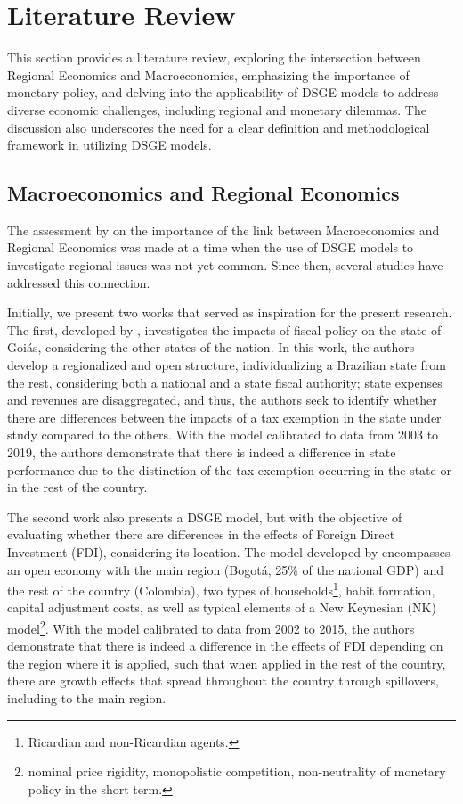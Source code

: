 \documentclass[../thesis.tex]{subfiles}
\begin{document}
\newpage

\section{Literature Review}\label{sec:literature-review}

This section provides a literature review, exploring the intersection between Regional Economics and Macroeconomics, emphasizing the importance of monetary policy, and delving into the applicability of DSGE models to address diverse economic challenges, including regional and monetary dilemmas. The discussion also underscores the need for a clear definition and methodological framework in utilizing DSGE models.

\subsection*{Macroeconomics and Regional Economics}

The assessment by \textcite{rickman_modern_2010} on the importance of the link between Macroeconomics and Regional Economics was made at a time when the use of DSGE models to investigate regional issues was not yet common. Since then, several studies have addressed this connection.

Initially, we present two works that served as inspiration for the present research. The first, developed by \textcite{costa_junior_dsge_2022}, investigates the impacts of fiscal policy on the state of Goiás, considering the other states of the nation. In this work, the authors develop a regionalized and open structure, individualizing a Brazilian state from the rest, considering both a national and a state fiscal authority; state expenses and revenues are disaggregated, and thus, the authors seek to identify whether there are differences between the impacts of a tax exemption in the state under study compared to the others. With the model calibrated to data from 2003 to 2019, the authors demonstrate that there is indeed a difference in state performance due to the distinction of the tax exemption occurring in the state or in the rest of the country.

The second work also presents a DSGE model, but with the objective of evaluating whether there are differences in the effects of Foreign Direct Investment (FDI), considering its location. The model developed by \textcite{mora_fdi_2019} encompasses an open economy with the main region (Bogotá, 25\% of the national GDP) and the rest of the country (Colombia), two types of households\footnote{ Ricardian and non-Ricardian agents.}, habit formation, capital adjustment costs, as well as typical elements of a New Keynesian (NK) model\footnote{ nominal price rigidity, monopolistic competition, non-neutrality of monetary policy in the short term.}. With the model calibrated to data from 2002 to 2015, the authors demonstrate that there is indeed a difference in the effects of FDI depending on the region where it is applied, such that when applied in the rest of the country, there are growth effects that spread throughout the country through spillovers, including to the main region.
\end{document}
